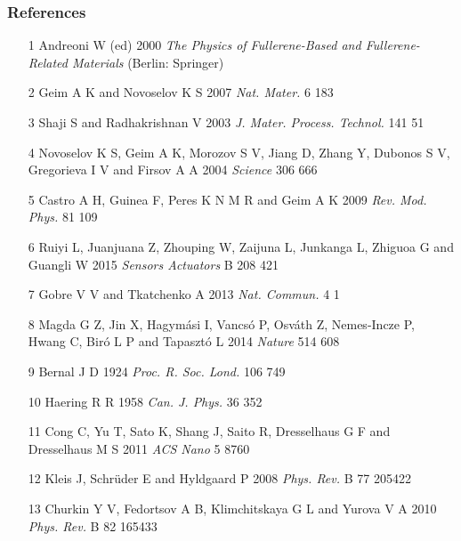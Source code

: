 \documentclass{article}
\begin{document}
\subsubsection{\textbf{References}}
\begin{itemize}
\item 
[1] Andreoni W (ed) 2000 \textit{The Physics of Fullerene-Based and Fullerene-Related Materials} (Berlin: Springer)

\item 
[2] Geim A K and Novoselov K S 2007 \textit{Nat. Mater.} 6 183

\item 
[3] Shaji S and Radhakrishnan V 2003 \textit{J. Mater. Process. Technol.} 141 51

\item 
[4] Novoselov K S, Geim A K, Morozov S V, Jiang D, Zhang Y, Dubonos S V, Gregorieva I V and Firsov A A 2004 \textit{Science} 306 666

\item 
[5] Castro A H, Guinea F, Peres K N M R and Geim A K 2009 \textit{Rev. Mod. Phys.} 81 109

\item 
[6] Ruiyi L, Juanjuana Z, Zhouping W, Zaijuna L, Junkanga L, Zhiguoa G and Guangli W 2015 \textit{Sensors Actuators} B 208 421

\item 
[7] Gobre V V and Tkatchenko A 2013 \textit{Nat. Commun.} 4 1

\item 
[8] Magda G Z, Jin X, Hagymási I, Vancsó P, Osváth Z, Nemes-Incze P, Hwang C, Biró L P and Tapasztó L 2014 \textit{Nature} 514 608

\item 
[9] Bernal J D 1924 \textit{Proc. R. Soc. Lond.} 106 749

\item 
[10] Haering R R 1958 \textit{Can. J. Phys.} 36 352

\item 
[11] Cong C, Yu T, Sato K, Shang J, Saito R, Dresselhaus G F and Dresselhaus M S 2011 \textit{ACS Nano} 5 8760

\item 
[12] Kleis J, Schrüder E and Hyldgaard P 2008 \textit{Phys. Rev.} B 77 205422

\item 
[13] Churkin Y V, Fedortsov A B, Klimchitskaya G L and Yurova V A 2010 \textit{Phys. Rev.} B 82 165433


\end{itemize}
\end{document}
